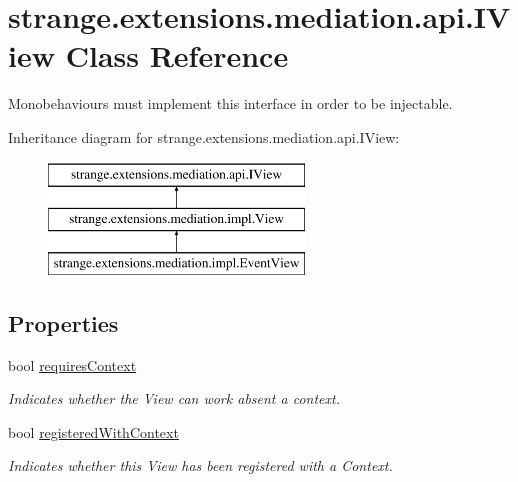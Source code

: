 \hypertarget{interfacestrange_1_1extensions_1_1mediation_1_1api_1_1_i_view}{\section{strange.\-extensions.\-mediation.\-api.\-I\-View Class Reference}
\label{interfacestrange_1_1extensions_1_1mediation_1_1api_1_1_i_view}
}


Monobehaviours must implement this interface in order to be injectable.  


Inheritance diagram for strange.\-extensions.\-mediation.\-api.\-I\-View\-:\begin{figure}[H]
\begin{center}
\leavevmode
\includegraphics[height=3.000000cm]{interfacestrange_1_1extensions_1_1mediation_1_1api_1_1_i_view}
\end{center}
\end{figure}
\subsection*{Properties}
\begin{DoxyCompactItemize}
\item 
bool \hyperlink{interfacestrange_1_1extensions_1_1mediation_1_1api_1_1_i_view_a0d9c314f274cd64133a8c97116ba9332}{requires\-Context}
\begin{DoxyCompactList}\small\item\em Indicates whether the View can work absent a context. \end{DoxyCompactList}\item 
\hypertarget{interfacestrange_1_1extensions_1_1mediation_1_1api_1_1_i_view_ac6eca04af420be4cb7ad637df4c8ff9c}{bool \hyperlink{interfacestrange_1_1extensions_1_1mediation_1_1api_1_1_i_view_ac6eca04af420be4cb7ad637df4c8ff9c}{registered\-With\-Context}}\label{interfacestrange_1_1extensions_1_1mediation_1_1api_1_1_i_view_ac6eca04af420be4cb7ad637df4c8ff9c}

\begin{DoxyCompactList}\small\item\em Indicates whether this View has been registered with a Context. \end{DoxyCompactList}\end{DoxyCompactItemize}


